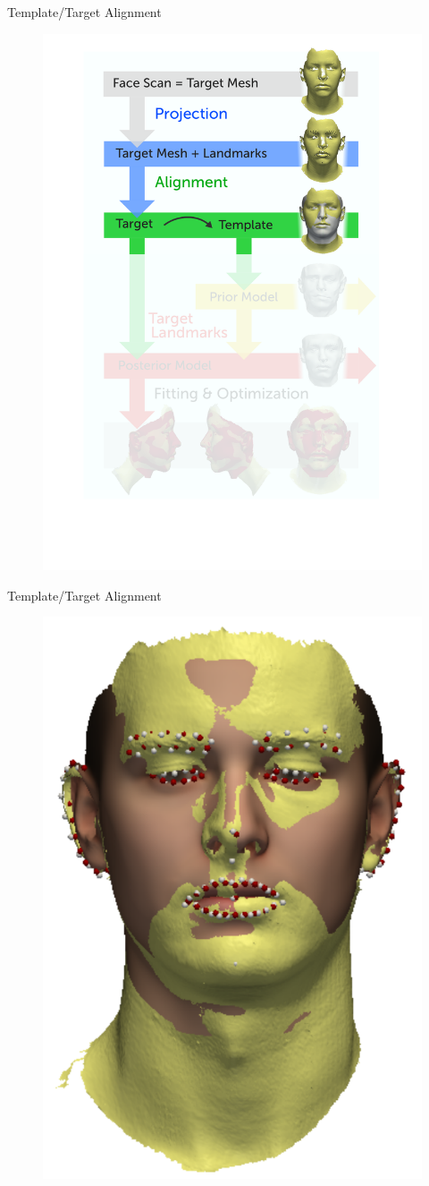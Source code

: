 \documentclass[xcolor=x11names,compress]{beamer}
\begin{document}
    \begin{frame}{Template/Target Alignment}
        \begin{figure}   
            \centering
            \includegraphics[width=.6\textwidth]{../resources/figures/pipeline_alignment.pdf}
        \end{figure}
    \end{frame}

    \begin{frame}{Template/Target Alignment}
        \begin{figure}   
            \centering
            \includegraphics[width=.6\textwidth]{../resources/img/alignment.pdf}
        \end{figure}
    \end{frame}
\end{document}
